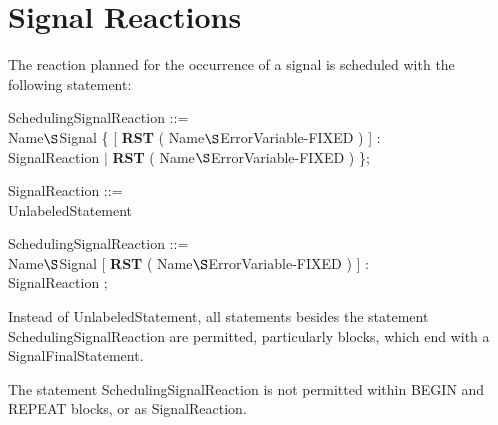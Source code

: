 \section{Signal Reactions}
The reaction planned for the occurrence of a signal is scheduled with
the following statement:

\begin{removed}
SchedulingSignalReaction ::=\\
 Name$\S $Signal \{ [ {\bf RST} ( Name$\S $ErrorVariable-FIXED ) ] :\\
\x \x SignalReaction $\mid$ {\bf RST} ( Name$\S $ErrorVariable-FIXED ) \};

SignalReaction ::=\\
\x UnlabeledStatement
\end{removed}

\begin{discuss}
SchedulingSignalReaction ::=\\
 Name$\S $Signal [ {\bf RST} ( Name$\S $ErrorVariable-FIXED ) ] :\\
\x \x SignalReaction ;







\end{discuss}

Instead of UnlabeledStatement, all statements besides the
statement SchedulingSignalReaction are permitted, particularly
blocks,  which  end with a SignalFinalStatement.

The statement SchedulingSignalReaction is not permitted within BEGIN
and REPEAT blocks, or as SignalReaction.

